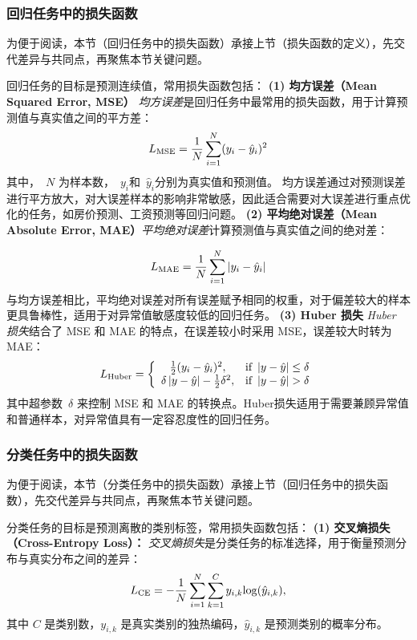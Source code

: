%
\subsubsection*{回归任务中的损失函数}

为便于阅读，本节（回归任务中的损失函数）承接上节（损失函数的定义），先交代差异与共同点，再聚焦本节关键问题。

回归任务的目标是预测连续值，常用损失函数包括：
{\bf (1) 均方误差（Mean Squared Error, MSE）}
{\em 均方误差}是回归任务中最常用的损失函数，用于计算预测值与真实值之间的平方差：
$$
L_{\rm MSE}= \frac{1}{N}\sum_{i=1}^N (y_i-\hat{y}_i)^2
$$
其中，~$N$ 为样本数，~$y_i$和~$\hat{y}_i$分别为真实值和预测值。
均方误差通过对预测误差进行平方放大，对大误差样本的影响非常敏感，因此适合需要对大误差进行重点优化的任务，如房价预测、工资预测等回归问题。
{\bf (2) 平均绝对误差（Mean Absolute Error, MAE）}{\em 平均绝对误差}计算预测值与真实值之间的绝对差：

$$
L_{\rm MAE}= \frac{1}{N}\sum_{i=1}^N \left| {y_i-\hat{y}_i} \right|
$$
与均方误差相比，平均绝对误差对所有误差赋予相同的权重，对于偏差较大的样本更具鲁棒性，适用于对异常值敏感度较低的回归任务。
{\bf (3) Huber 损失} {\em Huber 损失}结合了 MSE 和 MAE 的特点，在误差较小时采用 MSE，误差较大时转为 MAE： 
$$
L_{\rm Huber}= \left\{
\begin{array}{cl}
\frac{1}{2} (y_i-\hat{y}_i)^2, & \mbox{if }  \left| {y-\hat{y}} \right|\le \delta \\
  \delta \left|{y-\hat{y}} \right|-\frac{1}{2}\delta^2, &  \mbox{if } \left| {y-\hat{y}} \right|> \delta
\end{array}
\right.
$$
其中超参数~$\delta$  来控制 MSE 和 MAE 的转换点。Huber损失适用于需要兼顾异常值和普通样本，对异常值具有一定容忍度性的回归任务。


\subsubsection*{分类任务中的损失函数}

为便于阅读，本节（分类任务中的损失函数）承接上节（回归任务中的损失函数），先交代差异与共同点，再聚焦本节关键问题。

分类任务的目标是预测离散的类别标签，常用损失函数包括：
{\bf (1) 交叉熵损失（Cross-Entropy Loss）：}
{\em 交叉熵损失}是分类任务的标准选择，用于衡量预测分布与真实分布之间的差异：
\begin{equation}\label{eq}
L_{\rm CE}=-\frac{1}{N}\sum_{i=1}^N\sum_{k=1}^C y_{i,k} {\rm log}(\hat{y}_{i,k}),
\end{equation}
其中 $C$ 是类别数，$y_{i,k}$ 是真实类别的独热编码，$\hat{y}_{i,k}$ 是预测类别的概率分布。

